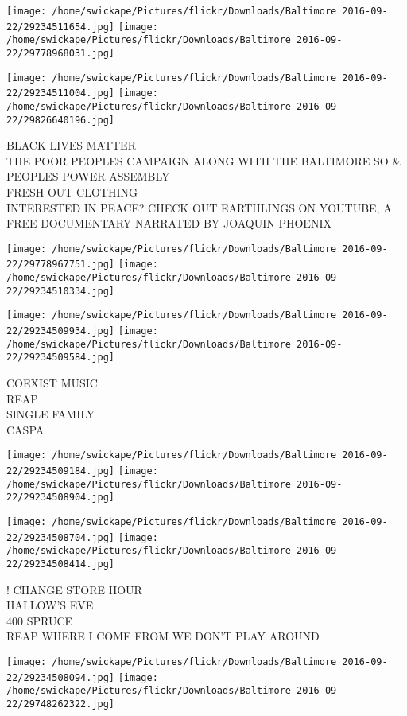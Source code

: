 \documentclass[10pt,letterpaper]{article}
\begin{document}
\texttt{[image: /home/swickape/Pictures/flickr/Downloads/Baltimore 2016-09-22/29234511654.jpg]}
\texttt{[image: /home/swickape/Pictures/flickr/Downloads/Baltimore 2016-09-22/29778968031.jpg]}

\texttt{[image: /home/swickape/Pictures/flickr/Downloads/Baltimore 2016-09-22/29234511004.jpg]}
\texttt{[image: /home/swickape/Pictures/flickr/Downloads/Baltimore 2016-09-22/29826640196.jpg]}

BLACK LIVES MATTER\\
THE POOR PEOPLES CAMPAIGN ALONG WITH THE BALTIMORE SO \& PEOPLES POWER ASSEMBLY\\
FRESH OUT CLOTHING\\
INTERESTED IN PEACE?  CHECK OUT EARTHLINGS ON YOUTUBE, A FREE DOCUMENTARY NARRATED BY JOAQUIN PHOENIX\\
\pagebreak

\texttt{[image: /home/swickape/Pictures/flickr/Downloads/Baltimore 2016-09-22/29778967751.jpg]}
\texttt{[image: /home/swickape/Pictures/flickr/Downloads/Baltimore 2016-09-22/29234510334.jpg]}

\texttt{[image: /home/swickape/Pictures/flickr/Downloads/Baltimore 2016-09-22/29234509934.jpg]}
\texttt{[image: /home/swickape/Pictures/flickr/Downloads/Baltimore 2016-09-22/29234509584.jpg]}

COEXIST MUSIC\\
REAP\\
SINGLE FAMILY\\
CASPA\\
\pagebreak

\texttt{[image: /home/swickape/Pictures/flickr/Downloads/Baltimore 2016-09-22/29234509184.jpg]}
\texttt{[image: /home/swickape/Pictures/flickr/Downloads/Baltimore 2016-09-22/29234508904.jpg]}

\texttt{[image: /home/swickape/Pictures/flickr/Downloads/Baltimore 2016-09-22/29234508704.jpg]}
\texttt{[image: /home/swickape/Pictures/flickr/Downloads/Baltimore 2016-09-22/29234508414.jpg]}

! CHANGE STORE HOUR\\
HALLOW'S EVE\\
400 SPRUCE\\
REAP WHERE I COME FROM WE DON'T PLAY AROUND\\
\pagebreak

\texttt{[image: /home/swickape/Pictures/flickr/Downloads/Baltimore 2016-09-22/29234508094.jpg]}
\texttt{[image: /home/swickape/Pictures/flickr/Downloads/Baltimore 2016-09-22/29748262322.jpg]}
\end{document}
